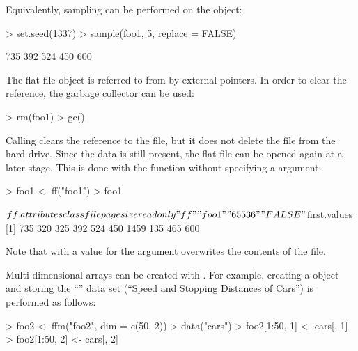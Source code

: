 \documentclass[12pt,a4paper]{article}
\begin{document}
Equivalently, sampling can be performed on the  object:
\begin{Schunk}
\begin{Sinput}
> set.seed(1337)
> sample(foo1, 5, replace = FALSE)
\end{Sinput}
\begin{Soutput}
[1] 735 392 524 450 600
\end{Soutput}
\end{Schunk}

The flat file object is referred to from \R{} by external pointers. In order to clear the reference, the garbage collector  can be used:

\begin{Schunk}
\begin{Sinput}
> rm(foo1)
> gc()
\end{Sinput}
\end{Schunk}

Calling  clears the reference to the file, but it does not delete the file from the hard drive. 
Since the data is still present, the flat file can be opened again at a later stage. 
This is done with the  function without specifying a  argument:

\begin{Schunk}
\begin{Sinput}
> foo1 <- ff("foo1")
> foo1
\end{Sinput}
\begin{Soutput}
$ff.attributes
   class     file pagesize readonly 
    "ff"   "foo1"  "65536"  "FALSE" 

$first.values
 [1]  735  320  325  392  524  450 1459  135  465  600
\end{Soutput}
\end{Schunk}

Note that  with a value for the  argument overwrites the contents of the file.

Multi-dimensional arrays can be created with . 
For example, creating a  object and storing the ``'' data set (``Speed and Stopping Distances of Cars'') is performed as follows:

\begin{Schunk}
\begin{Sinput}
> foo2 <- ffm("foo2", dim = c(50, 2))
> data("cars")
> foo2[1:50, 1] <- cars[, 1]
> foo2[1:50, 2] <- cars[, 2]
\end{Sinput}
\end{Schunk}
\end{document}

